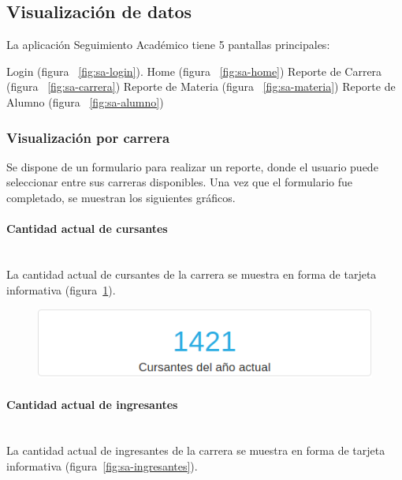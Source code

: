 \subsection{Visualización de datos}

La aplicación Seguimiento Académico tiene 5 pantallas principales:
\begin{outline}
 \1 Login (figura ~\ref{fig:sa-login}).
 \1 Home (figura ~\ref{fig:sa-home})
 \1 Reporte de Carrera (figura ~\ref{fig:sa-carrera})
 \1 Reporte de Materia (figura ~\ref{fig:sa-materia})
 \1 Reporte de Alumno (figura ~\ref{fig:sa-alumno})
\end{outline}

\subsubsection{Visualización por carrera}

Se dispone de un formulario para realizar un reporte, donde el usuario puede seleccionar entre sus carreras disponibles. Una vez que el formulario fue completado, se muestran los siguientes gráficos.

\paragraph{Cantidad actual de cursantes} \mbox{}\\
La cantidad actual de cursantes de la carrera se muestra en forma de tarjeta informativa (figura~\ref{fig:sa-cursantes}). 

\begin{figure}[H]
  \centering
    \includegraphics[scale=0.4]{images/seguimiento-academico/sa-cursantes.png}
  \label{fig:sa-cursantes}
\end{figure}

\paragraph{Cantidad actual de ingresantes} \mbox{}\\
La cantidad actual de ingresantes de la carrera se muestra en forma de tarjeta informativa (figura~\ref{fig:sa-ingresantes}).

